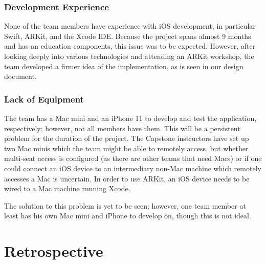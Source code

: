 \documentclass[onecolumn, draftclsnofoot,10pt, compsoc]{IEEEtran}
\begin{document}
\subsubsection{Development Experience}
None of the team members have experience with iOS development, in particular Swift, ARKit, and the Xcode IDE. Because the project spans almost 9 months and has an education components, this issue was to be expected. However, after looking deeply into various technologies and attending an ARKit workshop, the team developed a firmer idea of the implementation, as is seen in our design document.

\subsubsection{Lack of Equipment}
The team has a Mac mini and an iPhone 11 to develop and test the application, respectively; however, not all members have them. This will be a persistent problem for the duration of the project. The Capstone instructors have set up two Mac minis which the team might be able to remotely access, but whether multi-seat access is configured (as there are other teams that need Macs) or if one could connect an iOS device to an intermediary non-Mac machine which remotely accesses a Mac is uncertain. In order to use ARKit, an iOS device needs to be wired to a Mac machine running Xcode.

The solution to this problem is yet to be seen; however, one team member at least has his own Mac mini and iPhone to develop on, though this is not ideal.

\section{Retrospective}

\end{document}

